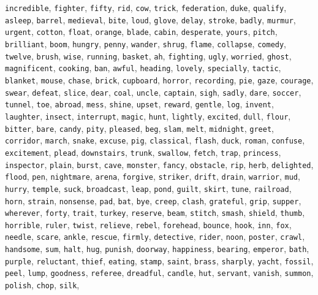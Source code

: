 \verb|incredible|, \verb|fighter|, \verb|fifty|, \verb|rid|, \verb|cow|, \verb|trick|, \verb|federation|, \verb|duke|, \verb|qualify|, \verb|asleep|, \verb|barrel|, \verb|medieval|, \verb|bite|, \verb|loud|, \verb|glove|, \verb|delay|, \verb|stroke|, \verb|badly|, \verb|murmur|, \verb|urgent|, \verb|cotton|, \verb|float|, \verb|orange|, \verb|blade|, \verb|cabin|, \verb|desperate|, \verb|yours|, \verb|pitch|, \verb|brilliant|, \verb|boom|, \verb|hungry|, \verb|penny|, \verb|wander|, \verb|shrug|, \verb|flame|, \verb|collapse|, \verb|comedy|, \verb|twelve|, \verb|brush|, \verb|wise|, \verb|running|, \verb|basket|, \verb|ah|, \verb|fighting|, \verb|ugly|, \verb|worried|, \verb|ghost|, \verb|magnificent|, \verb|cooking|, \verb|ban|, \verb|awful|, \verb|heading|, \verb|lovely|, \verb|specially|, \verb|tactic|, \verb|blanket|, \verb|mouse|, \verb|chase|, \verb|brick|, \verb|cupboard|, \verb|horror|, \verb|recording|, \verb|pie|, \verb|gaze|, \verb|courage|, \verb|swear|, \verb|defeat|, \verb|slice|, \verb|dear|, \verb|coal|, \verb|uncle|, \verb|captain|, \verb|sigh|, \verb|sadly|, \verb|dare|, \verb|soccer|, \verb|tunnel|, \verb|toe|, \verb|abroad|, \verb|mess|, \verb|shine|, \verb|upset|, \verb|reward|, \verb|gentle|, \verb|log|, \verb|invent|, \verb|laughter|, \verb|insect|, \verb|interrupt|, \verb|magic|, \verb|hunt|, \verb|lightly|, \verb|excited|, \verb|dull|, \verb|flour|, \verb|bitter|, \verb|bare|, \verb|candy|, \verb|pity|, \verb|pleased|, \verb|beg|, \verb|slam|, \verb|melt|, \verb|midnight|, \verb|greet|, \verb|corridor|, \verb|march|, \verb|snake|, \verb|excuse|, \verb|pig|, \verb|classical|, \verb|flash|, \verb|duck|, \verb|roman|, \verb|confuse|, \verb|excitement|, \verb|plead|, \verb|downstairs|, \verb|trunk|, \verb|swallow|, \verb|fetch|, \verb|trap|, \verb|princess|, \verb|inspector|, \verb|plain|, \verb|burst|, \verb|cave|, \verb|monster|, \verb|fancy|, \verb|obstacle|, \verb|rip|, \verb|herb|, \verb|delighted|, \verb|flood|, \verb|pen|, \verb|nightmare|, \verb|arena|, \verb|forgive|, \verb|striker|, \verb|drift|, \verb|drain|, \verb|warrior|, \verb|mud|, \verb|hurry|, \verb|temple|, \verb|suck|, \verb|broadcast|, \verb|leap|, \verb|pond|, \verb|guilt|, \verb|skirt|, \verb|tune|, \verb|railroad|, \verb|horn|, \verb|strain|, \verb|nonsense|, \verb|pad|, \verb|bat|, \verb|bye|, \verb|creep|, \verb|clash|, \verb|grateful|, \verb|grip|, \verb|supper|, \verb|wherever|, \verb|forty|, \verb|trait|, \verb|turkey|, \verb|reserve|, \verb|beam|, \verb|stitch|, \verb|smash|, \verb|shield|, \verb|thumb|, \verb|horrible|, \verb|ruler|, \verb|twist|, \verb|relieve|, \verb|rebel|, \verb|forehead|, \verb|bounce|, \verb|hook|, \verb|inn|, \verb|fox|, \verb|needle|, \verb|scare|, \verb|ankle|, \verb|rescue|, \verb|firmly|, \verb|detective|, \verb|rider|, \verb|noon|, \verb|poster|, \verb|crawl|, \verb|handsome|, \verb|sum|, \verb|halt|, \verb|hug|, \verb|punish|, \verb|doorway|, \verb|happiness|, \verb|bearing|, \verb|emperor|, \verb|bath|, \verb|purple|, \verb|reluctant|, \verb|thief|, \verb|eating|, \verb|stamp|, \verb|saint|, \verb|brass|, \verb|sharply|, \verb|yacht|, \verb|fossil|, \verb|peel|, \verb|lump|, \verb|goodness|, \verb|referee|, \verb|dreadful|, \verb|candle|, \verb|hut|, \verb|servant|, \verb|vanish|, \verb|summon|, \verb|polish|, \verb|chop|, \verb|silk|, 
